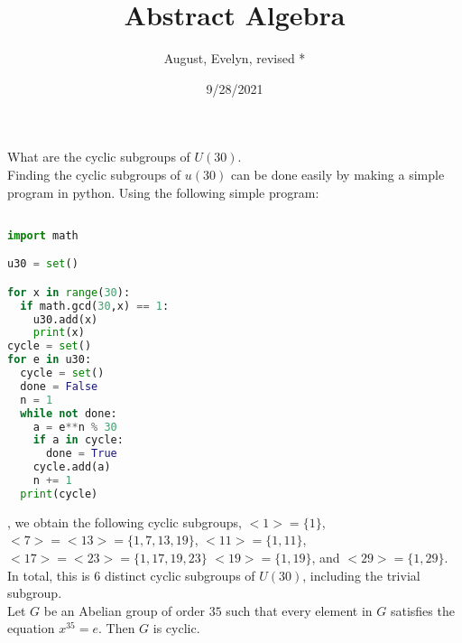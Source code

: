 \documentclass{article}
\title{Abstract Algebra}
\author{August, Evelyn, revised *}
\date{9/28/2021}
\begin{document}
\maketitle
{} What are the cyclic subgroups of $U(30)$.\\
 Finding the cyclic subgroups of $u(30)$ can be done easily by making a simple program in python. Using the following simple program: 


\begin{lstlisting}[language=Python]

import math

u30 = set()

for x in range(30):
  if math.gcd(30,x) == 1:
    u30.add(x)
    print(x)
cycle = set()
for e in u30:
  cycle = set()
  done = False
  n = 1
  while not done:
    a = e**n % 30
    if a in cycle:
      done = True
    cycle.add(a)
    n += 1
  print(cycle)
\end{lstlisting},
we obtain the following cyclic subgroups, $<1> = \{1\}$, $<7> = <13> = \{1,7,13,19\}$, $<11> = \{1,11\}$, $<17> = <23> =  \{1, 17,19,23\}$ $<19> = \{1,19\}$, and $<29> = \{1,29\}$. In total, this is $6$ distinct cyclic subgroups of $U(30)$, including the trivial subgroup.\\

 Let $G$ be an Abelian group of order $35$ such that every element in $G$ satisfies the equation $x^{35} = e$. Then $G$ is cyclic.\\
\end{document}

